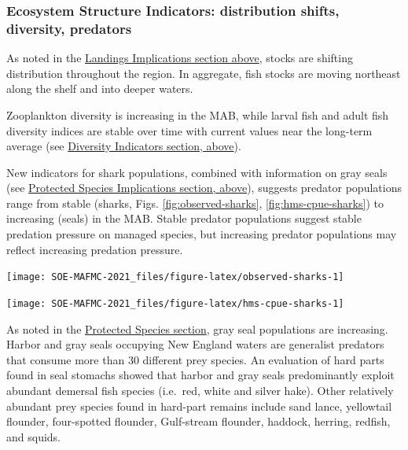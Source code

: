 \documentclass[
  10pt,
]{article}
\let\origfigure\figure
\let\endorigfigure\endfigure
\renewenvironment{figure}[1][2] {
    \expandafter\origfigure\expandafter[H]
} {
    \endorigfigure
}
\begin{document}
\hypertarget{ecosystem-structure-indicators-distribution-shifts-diversity-predators}{%
\subsubsection{Ecosystem Structure Indicators: distribution shifts,
diversity,
predators}\label{ecosystem-structure-indicators-distribution-shifts-diversity-predators}}

As noted in the \protect\hyperlink{implications}{Landings Implications
section above}, stocks are shifting distribution throughout the region.
In aggregate, fish stocks are moving northeast along the shelf and into
deeper waters.

Zooplankton diversity is increasing in the MAB, while larval fish and
adult fish diversity indices are stable over time with current values
near the long-term average (see
\protect\hyperlink{ecological-diversity}{Diversity Indicators section,
above}).

New indicators for shark populations, combined with information on gray
seals (see \protect\hyperlink{protected-species}{Protected Species
Implications section, above}), suggests predator populations range from
stable (sharks, Figs. \ref{fig:observed-sharks},
\ref{fig:hms-cpue-sharks}) to increasing (seals) in the MAB. Stable
predator populations suggest stable predation pressure on managed
species, but increasing predator populations may reflect increasing
predation pressure.

\begin{figure}

{\centering \texttt{[image: SOE-MAFMC-2021\_files/figure-latex/observed-sharks-1]} 

}

\caption{Estimated number of sharks per unit effort from Northeast Fisheries Observer Program data.}\label{fig:observed-sharks}
\end{figure}

\begin{figure}

{\centering \texttt{[image: SOE-MAFMC-2021\_files/figure-latex/hms-cpue-sharks-1]} 

}

\caption{Estimated number of sharks per unit effort from Highly Migratory Species Pelagic Observer Program data.}\label{fig:hms-cpue-sharks}
\end{figure}

As noted in the \protect\hyperlink{protected-species}{Protected Species
section}, gray seal populations are increasing. Harbor and gray seals
occupying New England waters are generalist predators that consume more
than 30 different prey species. An evaluation of hard parts found in
seal stomachs showed that harbor and gray seals predominantly exploit
abundant demersal fish species (i.e.~red, white and silver hake). Other
relatively abundant prey species found in hard-part remains include sand
lance, yellowtail flounder, four-spotted flounder, Gulf-stream flounder,
haddock, herring, redfish, and squids.
\end{document}
